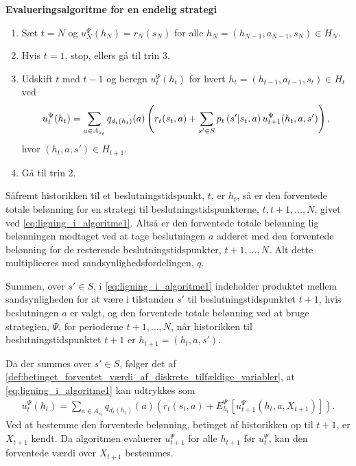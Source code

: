 \begin{alg} \textbf{Evalueringsalgoritme for en endelig strategi} \label{Algoritme1}%
\begin{enumerate}
    \item Sæt $t = N $ og $u_N^\Psi(h_N) = r_N(s_N)$ for alle $h_N = (h_{N-1}, a_{N-1}, s_N) \in H_N$.
    \item Hvis $t = 1$, stop, ellers gå til trin 3.
    \item Udskift $t$ med $t-1$ og beregn $u_t^\Psi(h_t)$ for hvert $h_t = (h_{t-1}, a_{t-1}, s_t)\in H_t$ ved \begin{align}\label{eq:ligning_i_algoritme1}
        \vspace{-0.5cm}u_t^\Psi(h_t) = \sum_{a \in A_{s_t}}q_{d_t(h_t)}(a)\left(r_t(s_t, a) + \sum_{s' \in S} p_t\left(s'|s_t,a\right)u_{t+1}^\Psi(h_t,a,s')\right),
    \end{align}
    hvor $(h_t, a ,s') \in H_{t+1}$.
    \item Gå til trin 2.
\end{enumerate}
\end{alg}

Såfremt historikken til et beslutningstidspunkt, $t$, er $h_t$, så er den forventede totale belønning for en strategi til beslutningstidspunkterne, $t, t+1, \ldots, N$, givet ved \eqref{eq:ligning_i_algoritme1}. Altså er den forventede totale belønning lig belønningen modtaget ved at tage beslutningen $a$ adderet med den forventede belønning for de resterende beslutningstidspunkter, $t+1, \ldots, N$. Alt dette multipliceres med sandsynlighedsfordelingen, $q$. 

Summen, over $s' \in S$, i \eqref{eq:ligning_i_algoritme1} indeholder produktet mellem sandsynligheden for at være i tilstanden $s'$ til beslutningstidspunktet $t+1$, hvis beslutningen $a$ er valgt, og den forventede totale belønning ved at bruge strategien, $\Psi$, for perioderne $t+1, \ldots, N$, når historikken til beslutningstidspunktet $t+1$ er $h_{t+1} = (h_t, a, s')$. 

Da der summes over $s' \in S$, følger det af \autoref{def:betinget_forventet_værdi_af_diskrete_tilfældige_variabler}, at \eqref{eq:ligning_i_algoritme1} kan udtrykkes som 
\begin{align}\label{eq:algoritme_ligning_vol2}
    u_t^\Psi(h_t)=\sum_{a \in A_{s_t}}q_{d_t(h_t)}(a)\left(r_t\left(s_t,a\right)+E_{h_t}^\Psi\left[u_{t+1}^\Psi\left(h_t, a, X_{t+1}\right)\right]\right).
\end{align}
Ved at bestemme den forventede belønning, betinget af historikken op til $t+1$, er $X_{t+1}$ kendt. Da algoritmen evaluerer $u^\Psi_{t+1}$ for alle $h_{t+1}$ før $u^\Psi_t$, kan den forventede værdi over $X_{t+1}$ bestemmes.

